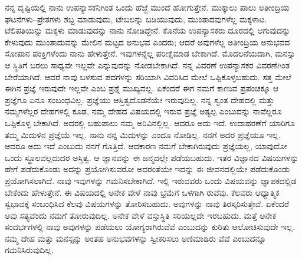 ನನ್ನ ದೃಷ್ಟಿಯಲ್ಲಿ ನಾನು ಉಪನ್ಯಾಸಕನಿಗಿಂತ ಒಂದು ಹೆಜ್ಜೆ ಮುಂದೆ ಹೋಗುತ್ತೇನೆ. ಮುಕ್ಕಾಲು ಪಾಲು ಅತೀಂದ್ರಿಯ ಘಟನೆಗಳು–ಪ್ರೇತಗಳು ಶಬ್ದ ಮಾಡುವುದು, ಟೇಬಲನ್ನು ಬಡಿಯುವುದು, ಮುಂತಾದವುಗಳೆಲ್ಲ ಮಕ್ಕಳಾಟ. ಟೆಲಿಪತಿಯನ್ನು ಮಕ್ಕಳು ಮಾಡುವುದನ್ನು ನಾನು ನೋಡಿದ್ದೇನೆ. ಕೊನೆಯ ಉಪನ್ಯಾಸಕರು ದೂರದಲ್ಲಿ ಆಗುವುದನ್ನು ಕೇಳುವುದು ಮುಂತಾದುವನ್ನು ಮೇಲಿನ ಮಟ್ಟದ ಅನುಭವ ಎಂದರು; ಆದರೆ ಅವುಗಳೆಲ್ಲ ಅತೀಂದ್ರಿಯ ಅನುಭವದ ಸೋಪಾನ ಪಂಕ್ತಿಗಳೆಂದು ನಾನು ಹೇಳುತ್ತೇನೆ. ಇವುಗಳನ್ನೆಲ್ಲ ಪರೀಕ್ಷೆಮಾಡ ಬೇಕಾಗಿದೆ. ಮೊದಲನೆಯದಾಗಿ, ಮನಸ್ಸು ಆ ಸ್ಥಿತಿಗೆ ಬರಲು ಸಾಧ್ಯವೇ ಇಲ್ಲವೇ ಎನ್ನುವುದನ್ನು ನೋಡಬೇಕಾಗಿದೆ. ನನ್ನ ವಿವರಣೆ ಉಪನ್ಯಾಸಕರ ವಿವರಣೆಗಿಂತ ಬೇರೆಯಾಗಿದೆ. ಆದರೆ ನಾವು ಬಳಸುವ ಪದಗಳನ್ನು ಸರಿಯಾಗಿ ವಿವರಿಸಿದ ಮೇಲೆ ಒಪ್ಪಿಕೊಳ್ಳಬಹುದು. ಸತ್ತ ಮೇಲೆ ಈಗಿನ ಪ್ರಜ್ಞೆ ಇರುವುದೇ ಇಲ್ಲವೇ ಎಂಬ ಪ್ರಶ್ನೆ ಮುಖ್ಯವಲ್ಲ. ಏಕೆಂದರೆ ಈಗ ನಮಗೆ ಕಾಣುವ ಪ್ರಪಂಚಕ್ಕೂ ಆ ಪ್ರಜ್ಞೆಗೂ ಏನೂ ಸಂಬಂಧವಿಲ್ಲ. ಪ್ರಜ್ಞೆಯು ಆಸ್ತಿತ್ವದೊಡನೆಯೇ ಇರುವುದಿಲ್ಲ. ನನ್ನ ಸ್ವಂತ ದೇಹದಲ್ಲಿ ಮತ್ತು ನಮ್ಮಗಳೆಲ್ಲರ ದೇಹಗಳಲ್ಲಿ ಕೂಡ, ನಮ್ಮ ದೇಹದ ವಿಷಯದಲ್ಲಿ ಇರುವ ಪ್ರಜ್ಞೆ ಅತ್ಯಲ್ಪ ಎಂಬುದನ್ನು ನಾವೆಲ್ಲರೂ ಒಪ್ಪಿಕೊಳ್ಳ ಬೇಕಾಗಿದೆ. ಅದರಲ್ಲಿ ಬಹುಪಾಲು ನಮ್ಮ ಅರಿವಿನಲ್ಲಿಲ್ಲ. ಆದರೂ ಅದು ಇದೆ. ಉದಾಹರಣೆಗೆ ಯಾರಿಗೂ ತಮ್ಮ ಮಿದುಳಿನ ಪ್ರಜ್ಞೆಯೆ ಇಲ್ಲ. ನಾನು ನನ್ನ ಮಿದುಳನ್ನು ಎಂದೂ ನೋಡಿಲ್ಲ. ನನಗೆ ಅದರ ಪ್ರಜ್ಞೆಯೂ ಇಲ್ಲ. ಆದರೂ ಅದು ಇದೆ ಎಂಬುದು ನನಗೆ ಗೊತ್ತಿದೆ. ಆದಕಾರಣ ನಮಗೆ ಬೇಕಾಗಿರುವುದು ಪ್ರಜ್ಞೆಯಲ್ಲ, ಯಾವುದೋ ಒಂದು ಸ್ಥೂಲವಲ್ಲದುದರ ಅಸ್ತಿತ್ವ. ಆ ಜ್ಞಾನವನ್ನು ಈ ಜನ್ಮದಲ್ಲೇ ಪಡೆಯಬಹುದು. ಇತರ ವಿಜ್ಞಾನದ ವಿಷಯಗಳನ್ನು ಹೇಗೆ ಪಡೆದುಕೊಂಡು ಅದನ್ನು ಪ್ರಯೋಗಿಸುವರೋ ಅದರಂತೆಯೇ ಇದನ್ನು ಈ ಜೀವನದಲ್ಲಿಯೇ ಪಡೆದುಕೊಂಡು ಪ್ರಯೋಗಿಸಲಾಗಿದೆ. ನಾವು ಇವುಗಳನ್ನು ಗಮನಿಸಬೇಕಾಗಿದೆ. ಇಲ್ಲಿ ಇರುವವರು ಒಂದು ವಿಷಯವನ್ನು ಜ್ಞಾಪಕದಲ್ಲಿಡ ಬೇಕೆಂದು ಹೇಳುತ್ತೇನೆ. ಈ ವಿಷಯದಲ್ಲಿ ಅನೇಕ ವೇಳೆ ನಾವು ಭ್ರಮೆಗೆ ಒಳಗಾಗಿ ರುವೆವು. ಕೆಲವರು ಆಧ್ಯಾತ್ಮಿಕ ಸ್ವಭಾವಕ್ಕೆ ಸಂಬಂಧಿಸಿದ ಕೆಲವು ವಿಷಯಗಳನ್ನು ತೋರಿಸಬಹುದು. ಅವುಗಳನ್ನು ನಾವು ತಿರಸ್ಕರಿಸುತ್ತೇವೆ. ಏಕೆಂದರೆ ಅವು ಸತ್ಯವೆಂದು ನಮಗೆ ತೋರುವುದಿಲ್ಲ. ಅನೇಕ ವೇಳೆ ವಸ್ತುಸ್ಥಿತಿ ಸರಿಯಲ್ಲದೇ ಇರಬಹುದು. ಮತ್ತೆ ಅನೇಕ ಸಂದರ್ಭಗಳಲ್ಲಿ ನಾವು ಅವುಗಳನ್ನು ಪಡೆಯಲು ಯೋಗ್ಯರಾಗಿರುವೆವೆ ಎಂಬುದನ್ನು ಕುರಿತು ಆಲೋಚಿಸುವುದೇ ಇಲ್ಲ. ನಮ್ಮ ದೇಹ ಮತ್ತು ಮನಸ್ಸನ್ನು ಅಂತಹ ಅನುಭವಗಳನ್ನು ಸ್ವೀಕರಿಸಲು ಅಣಿಮಾಡಿರು ವೆವೆ ಎಂಬುದನ್ನೂ ಗಮನಿಸಿರುವುದಿಲ್ಲ.

